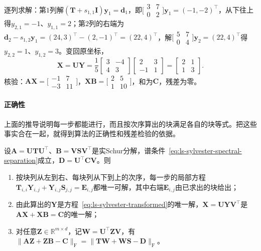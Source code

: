 \begin{example}
逐列求解：第$1$列解$(\bm T+s_{1,1}\bm I)\bm y_1=\bm d_1$，即$\bigl[\begin{smallmatrix}3&7\\0&2\end{smallmatrix}\bigr]\bm y_1=(-1,-2)^\top$，从下往上得$y_{2,1}=-1$、$y_{1,1}=2$；第$2$列的右端为$\bm d_2-s_{1,2}\bm y_1=(24,3)^\top-(2,-1)^\top=(22,4)^\top$，解$\bigl[\begin{smallmatrix}5&7\\0&4\end{smallmatrix}\bigr]\bm y_2=(22,4)^\top$得$y_{2,2}=1$、$y_{1,2}=3$。变回原坐标，
\[
 \bm X=\bm U\bm Y=\frac15\begin{bmatrix}3&-4\\4&3\end{bmatrix}\begin{bmatrix}2&3\\-1&1\end{bmatrix}=\begin{bmatrix}2&1\\1&3\end{bmatrix}.
\]
核验：$\bm A\bm X=\bigl[\begin{smallmatrix}-1&7\\-3&11\end{smallmatrix}\bigr]$，$\bm X\bm B=\bigl[\begin{smallmatrix}2&5\\1&10\end{smallmatrix}\bigr]$，和为$\bm C$，残差为零。
\end{example}

\paragraph{正确性}
上面的推导说明每一步都能进行，而且按次序算出的块满足各自的块等式。把这些事实合在一起，就得到算法的正确性和残差检验的依据。

\begin{theorem}
\label{thm:ls-bartels-stewart}
设$\bm A=\bm U\bm T\bm U^\top$、$\bm B=\bm V\bm S\bm V^\top$是实Schur分解，谱条件~\eqref{eq:ls-sylvester-spectral-separation}成立，$\bm D=\bm U^\top\bm C\bm V$。则
\begin{enumerate}
 \item 按块列从左到右、每块列从下到上的次序，每一步的局部方程$\bm T_{i,i}\bm Y_{i,j}+\bm Y_{i,j}\bm S_{j,j}=\bm E_{i,j}$都唯一可解，其中右端$\bm E_{i,j}$由已求出的块给出；
 \item 由此算出的$\bm Y$是方程~\eqref{eq:ls-sylvester-transformed}的唯一解，$\bm X=\bm U\bm Y\bm V^\top$是$\bm A\bm X+\bm X\bm B=\bm C$的唯一解；
 \item 对任意$\bm Z\in\mathbb R^{m\times d}$，记$\bm W=\bm U^\top\bm Z\bm V$，有$\lVert\bm A\bm Z+\bm Z\bm B-\bm C\rVert_{\mathrm F}=\lVert\bm T\bm W+\bm W\bm S-\bm D\rVert_{\mathrm F}$。
\end{enumerate}
\end{theorem}

